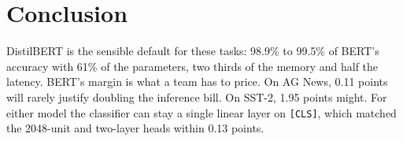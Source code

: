 \section{Conclusion}

DistilBERT is the sensible default for these tasks: 98.9\% to 99.5\% of
BERT's accuracy with 61\% of the parameters, two thirds of the memory and half
the latency. BERT's margin is what a team has to price. On AG News, 0.11
points will rarely justify doubling the inference bill. On SST-2, 1.95 points
might. For either model the classifier can stay a single linear layer on
\texttt{[CLS]}, which matched the 2048-unit and two-layer heads within 0.13
points.

